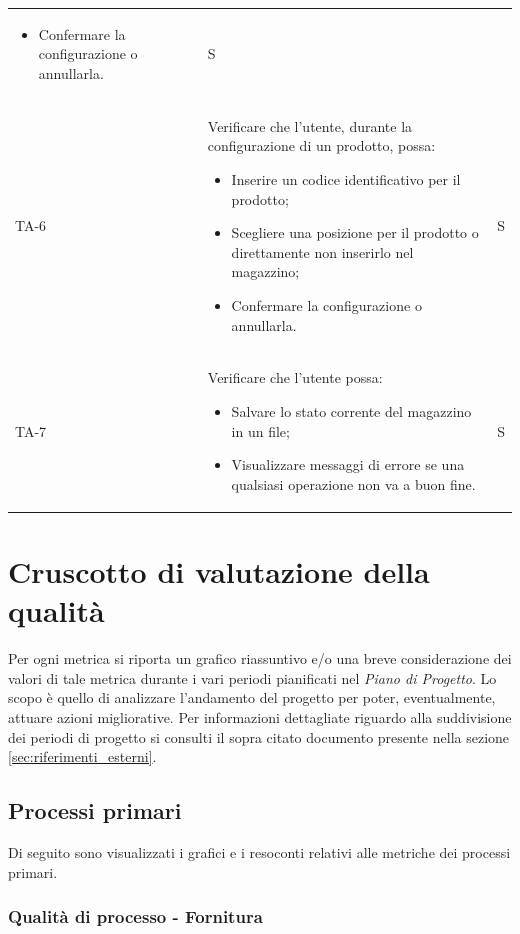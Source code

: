 \begin{xltabular}{0.9\textwidth}{X | p{0.7\textwidth} | X}
\begin{itemize}
        \item Confermare la configurazione o annullarla.
    \end{itemize} 
    & S \\
    TA-6 & Verificare che l'utente, durante la configurazione di un prodotto, possa:
    \begin{itemize}
        \item Inserire un codice identificativo per il prodotto;
        \item Scegliere una posizione per il prodotto o direttamente non inserirlo nel magazzino;
        \item Confermare la configurazione o annullarla.
    \end{itemize} 
    & S \\
    TA-7 & Verificare che l'utente possa:
    \begin{itemize}
        \item Salvare lo stato corrente del magazzino in un file;
        \item Visualizzare messaggi di errore se una qualsiasi operazione non va a buon fine.
    \end{itemize} 
    & S \\
    \hline
\end{xltabular}


\newpage
\section{Cruscotto di valutazione della qualità}\label{resoconto}
Per ogni metrica si riporta un grafico riassuntivo e/o una breve considerazione dei valori di tale metrica durante i vari periodi pianificati nel \textit{Piano di Progetto}. Lo scopo è quello di analizzare l'andamento del progetto per poter, eventualmente, attuare azioni migliorative. Per informazioni dettagliate riguardo alla suddivisione dei periodi di progetto si consulti il sopra citato documento presente nella sezione \ref{sec:riferimenti_esterni}.

\subsection{Processi primari} \label{sec:processi_primari}
Di seguito sono visualizzati i grafici e i resoconti relativi alle metriche dei processi primari. 
\subsubsection{Qualità di processo - Fornitura}
